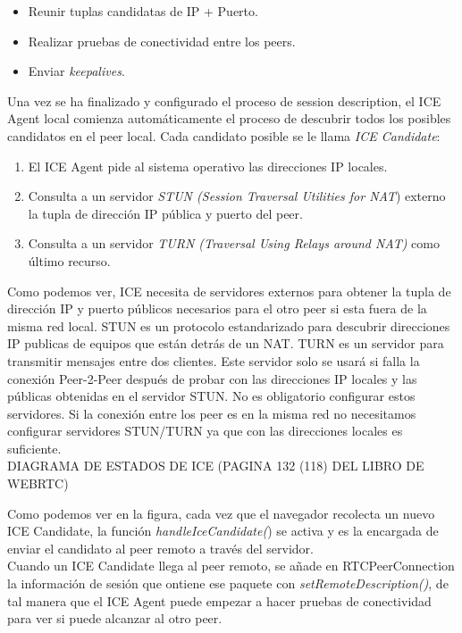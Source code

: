 \begin{itemize}
\item Reunir tuplas candidatas de IP + Puerto.
\item Realizar pruebas de conectividad entre los peers.
\item Enviar \textit{keepalives}.
\end{itemize}

Una vez se ha finalizado y configurado el proceso de session description, el ICE Agent local comienza automáticamente el proceso de descubrir todos los posibles candidatos en el peer local. Cada candidato posible se le llama \textit{ICE Candidate}:

\begin{enumerate}
\item El ICE Agent pide al sistema operativo las direcciones IP locales.
\item Consulta a un servidor \emph{STUN (Session Traversal Utilities for NAT}) externo la tupla de dirección IP pública y puerto del peer.
\item Consulta a un servidor \emph{TURN (Traversal Using Relays around NAT)} como último recurso. 
\end{enumerate}

Como podemos ver, ICE necesita de servidores externos para obtener la tupla de dirección IP y puerto públicos necesarios para el otro peer si esta fuera de la misma red local. STUN  es un protocolo estandarizado para descubrir direcciones IP publicas de equipos que están detrás de un NAT. TURN es un servidor para transmitir mensajes entre dos clientes. Este servidor solo se usará si falla la conexión Peer-2-Peer después de probar con las direcciones IP locales y las públicas obtenidas en el servidor STUN. No es obligatorio configurar estos servidores. Si la conexión entre los peer es en la misma red no necesitamos configurar servidores STUN/TURN ya que con las direcciones locales es suficiente.\\

DIAGRAMA DE ESTADOS DE ICE (PAGINA 132 (118) DEL LIBRO DE WEBRTC)

Como podemos ver en la figura, cada vez que el navegador recolecta un nuevo ICE Candidate, la función \textit{handleIceCandidate(}) se activa y es la encargada de enviar el candidato al peer remoto a través del servidor.\\
 
Cuando un ICE Candidate llega al peer remoto, se añade en RTCPeerConnection la información de sesión que ontiene ese paquete con \textit{setRemoteDescription()}, de tal manera que el ICE Agent puede empezar a hacer pruebas de conectividad para ver si puede alcanzar al otro peer.\\

